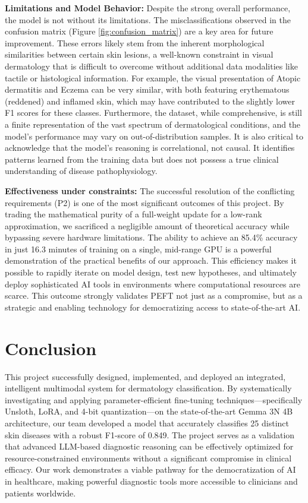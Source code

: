 \documentclass[11pt]{article}
\begin{document}
\textbf{Limitations and Model Behavior:} Despite the strong overall performance, the model is not without its limitations. The misclassifications observed in the confusion matrix (Figure \ref{fig:confusion_matrix}) are a key area for future improvement. These errors likely stem from the inherent morphological similarities between certain skin lesions, a well-known constraint in visual dermatology that is difficult to overcome without additional data modalities like tactile or histological information. For example, the visual presentation of Atopic dermatitis and Eczema can be very similar, with both featuring erythematous (reddened) and inflamed skin, which may have contributed to the slightly lower F1 scores for these classes. Furthermore, the dataset, while comprehensive, is still a finite representation of the vast spectrum of dermatological conditions, and the model's performance may vary on out-of-distribution samples. It is also critical to acknowledge that the model's reasoning is correlational, not causal. It identifies patterns learned from the training data but does not possess a true clinical understanding of disease pathophysiology.

\textbf{Effectiveness under constraints:} The successful resolution of the conflicting requirements (P2) is one of the most significant outcomes of this project. By trading the mathematical purity of a full-weight update for a low-rank approximation, we sacrificed a negligible amount of theoretical accuracy while bypassing severe hardware limitations. The ability to achieve an 85.4\% accuracy in just 16.3 minutes of training on a single, mid-range GPU is a powerful demonstration of the practical benefits of our approach. This efficiency makes it possible to rapidly iterate on model design, test new hypotheses, and ultimately deploy sophisticated AI tools in environments where computational resources are scarce. This outcome strongly validates PEFT not just as a compromise, but as a strategic and enabling technology for democratizing access to state-of-the-art AI.

\section{Conclusion}
This project successfully designed, implemented, and deployed an integrated, intelligent multimodal system for dermatology classification. By systematically investigating and applying parameter-efficient fine-tuning techniques—specifically Unsloth, LoRA, and 4-bit quantization—on the state-of-the-art Gemma 3N 4B architecture, our team developed a model that accurately classifies 25 distinct skin diseases with a robust F1-score of 0.849. The project serves as a validation that advanced LLM-based diagnostic reasoning can be effectively optimized for resource-constrained environments without a significant compromise in clinical efficacy. Our work demonstrates a viable pathway for the democratization of AI in healthcare, making powerful diagnostic tools more accessible to clinicians and patients worldwide.
\end{document}
